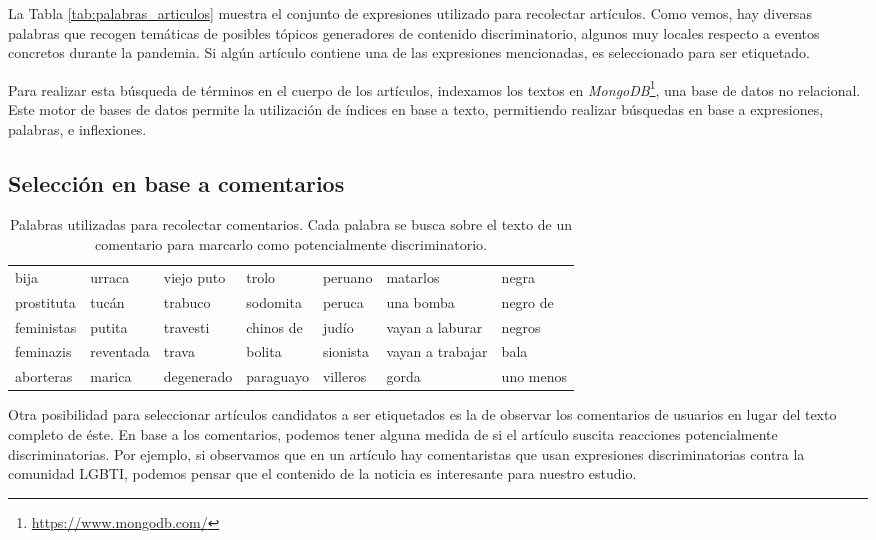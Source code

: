 La Tabla \ref{tab:palabras_articulos} muestra el conjunto de expresiones utilizado para recolectar artículos. Como vemos, hay diversas palabras que recogen temáticas de posibles tópicos generadores de contenido discriminatorio, algunos muy locales respecto a eventos concretos durante la pandemia. Si algún artículo contiene una de las expresiones mencionadas, es seleccionado para ser etiquetado.

Para realizar esta búsqueda de términos en el cuerpo de los artículos, indexamos los textos en \emph{MongoDB}\footnote{\url{https://www.mongodb.com/}}, una base de datos no relacional. Este motor de bases de datos permite la utilización de índices en base a texto, permitiendo realizar búsquedas en base a expresiones, palabras, e inflexiones.



\subsection{Selección en base a comentarios}
\label{subsec:seleccion_comentarios}


\begin{table*}[h]
    \centering
    \small
    \begin{tabular}{l l l l l l l}
    \hline
    bija          & urraca     & viejo puto    & trolo      & peruano  & matarlos         & negra      \\
    prostituta    & tucán      & trabuco       & sodomita   & peruca   & una bomba        & negro de   \\
    feministas    & putita     & travesti      & chinos de  & judío    & vayan a laburar  & negros     \\
    feminazis     & reventada  & trava         & bolita     & sionista & vayan a trabajar & bala       \\
    aborteras     & marica     & degenerado    & paraguayo  & villeros & gorda            & uno menos  \\
    \hline
    \end{tabular}
    \caption{Palabras utilizadas para recolectar comentarios. Cada palabra se busca sobre el texto de un comentario para marcarlo como potencialmente discriminatorio.}
    \label{tab:palabras_comentarios}
\end{table*}

Otra posibilidad para seleccionar artículos candidatos a ser etiquetados es la de observar los comentarios de usuarios en lugar del texto completo de éste. En base a los comentarios, podemos tener alguna medida de si el artículo suscita reacciones potencialmente discriminatorias. Por ejemplo, si observamos que en un artículo hay comentaristas que usan expresiones discriminatorias contra la comunidad LGBTI, podemos pensar que el contenido de la noticia es interesante para nuestro estudio.

